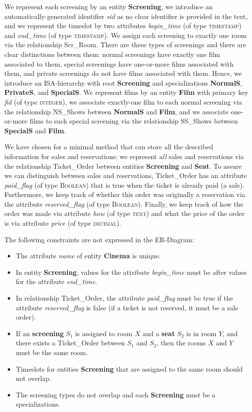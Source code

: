 \documentclass{article}
\newcommand{\ent}[1]{\textbf{#1}}
\newcommand{\attr}[1]{\emph{#1}}
\newcommand{\rel}[1]{\textsf{#1}}
\newcommand{\domain}[1]{(of type \textsc{#1})}
\begin{document}
We represent each screening by an entity \ent{Screening}, we introduce an automatically-generated identifier \attr{sid} as no clear identifier is provided in the text, and we represent the timeslot by two attributes \attr{begin\_time} \domain{timestamp} and \attr{end\_time} \domain{timestamp}. We assign each screening to exactly one room via the relationship \rel{Scr\_Room}. There are three types of screenings and there are clear distinctions between them: normal screenings have exactly one film associated to them, special screenings have one-or-more films associated with them, and private screenings do not have films associated with them. Hence, we introduce an ISA-hierarchy with root \ent{Screening} and specializations \ent{NormalS}, \ent{PrivateS}, and \ent{SpecialS}. We represent films by an entity \ent{Film} with primary key \attr{fid} \domain{integer}, we associate exactly-one film to each normal screening via the relationship \rel{NS\_Shows} between \ent{NormalS} and \ent{Film}, and we associate one-or-more films to each special screening via the relationship \rel{SS\_Shows} between \ent{SpecialS} and \ent{Film}.

We have chosen for a minimal method that can store all the described information for sales and reservations: we represent \emph{all} sales and reservations via the relationship \rel{Ticket\_Order} between entities \ent{Screening} and \ent{Seat}. To assure we can distinguish between sales and reservations, \rel{Ticket\_Order} has an attribute \attr{paid\_flag} \domain{Boolean} that is true when the ticket is already paid (a sale). Furthermore, we keep track of whether this order was originally a reservation via the attribute \attr{reserved\_flag} \domain{Boolean}. Finally, we keep track of how the order was made via attribute \attr{how} \domain{text} and what the price of the order is via attribute \attr{price} \domain{decimal}.

The following constraints are not expressed in the ER-Diagram:
\begin{itemize}
\item The attribute \attr{name} of entity \ent{Cinema} is unique.
\item In entity \ent{Screening}, values for the attribute \attr{begin\_time}  must be after values for the attribute \attr{end\_time}.
\item In relationship \rel{Ticket\_Order}, the attribute \attr{paid\_flag} must be true if the attribute \attr{reserved\_flag} is false (if a ticket is not reserved, it must be a sale order).
\item If an \ent{screening} $S_1$ is assigned to room $X$ and a \ent{seat} $S_2$ is in room $Y$, and there exists a \rel{Ticket\_Order} between $S_1$ and $S_2$, then the rooms $X$ and $Y$ must be the same room.
\item Timeslots for entities \ent{Screening} that are assigned to the same room should not overlap.
\item The screening types do not overlap and each \ent{Screening} must be a specializations.
\end{itemize}
\end{document}
